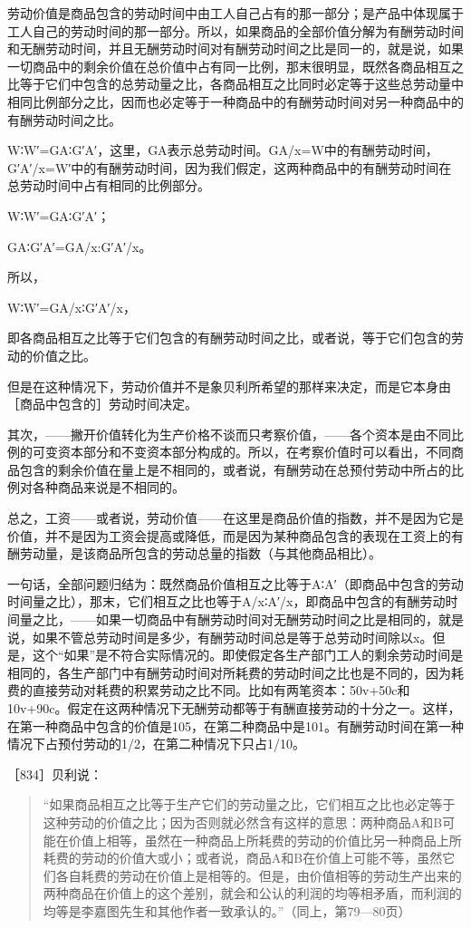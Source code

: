 劳动价值是商品包含的劳动时间中由工人自己占有的那一部分；是产品中体现属于工人自己的劳动时间的那一部分。所以，如果商品的全部价值分解为有酬劳动时间和无酬劳动时间，并且无酬劳动时间对有酬劳动时间之比是同一的，就是说，如果一切商品中的剩余价值在总价值中占有同一比例，那末很明显，既然各商品相互之比等于它们中包含的总劳动量之比，各商品相互之比同时必定等于这些总劳动量中相同比例部分之比，因而也必定等于一种商品中的有酬劳动时间对另一种商品中的有酬劳动时间之比。

W∶W′=GA∶G′A′，这里，GA表示总劳动时间。GA/x=W中的有酬劳动时间，G′A′/x=W′中的有酬劳动时间，因为我们假定，这两种商品中的有酬劳动时间在总劳动时间中占有相同的比例部分。

W∶W′=GA∶G′A′；

GA∶G′A′=GA/x:G′A′/x。

所以，

W∶W′=GA/x∶G′A′/x，

即各商品相互之比等于它们包含的有酬劳动时间之比，或者说，等于它们包含的劳动的价值之比。

但是在这种情况下，劳动价值并不是象贝利所希望的那样来决定，而是它本身由［商品中包含的］劳动时间决定。

其次，——撇开价值转化为生产价格不谈而只考察价值，——各个资本是由不同比例的可变资本部分和不变资本部分构成的。所以，在考察价值时可以看出，不同商品包含的剩余价值在量上是不相同的，或者说，有酬劳动在总预付劳动中所占的比例对各种商品来说是不相同的。

总之，工资——或者说，劳动价值——在这里是商品价值的指数，并不是因为它是价值，并不是因为工资会提高或降低，而是因为某种商品包含的表现在工资上的有酬劳动量，是该商品所包含的劳动总量的指数（与其他商品相比）。

一句话，全部问题归结为：既然商品价值相互之比等于A∶A′（即商品中包含的劳动时间量之比），那末，它们相互之比也等于A/x∶A′/x，即商品中包含的有酬劳动时间量之比，——如果一切商品中有酬劳动时间对无酬劳动时间之比是相同的，就是说，如果不管总劳动时间是多少，有酬劳动时间总是等于总劳动时间除以x。但是，这个“如果”是不符合实际情况的。即使假定各生产部门工人的剩余劳动时间是相同的，各生产部门中有酬劳动时间对所耗费的劳动时间之比也是不同的，因为耗费的直接劳动对耗费的积累劳动之比不同。比如有两笔资本：50v+50c和10v+90c。假定在这两种情况下无酬劳动都等于有酬直接劳动的十分之一。这样，在第一种商品中包含的价值是105，在第二种商品中是101。有酬劳动时间在第一种情况下占预付劳动的1/2，在第二种情况下只占1/10。

［834］贝利说：

\begin{quote}{“如果商品相互之比等于生产它们的劳动量之比，它们相互之比也必定等于这种劳动的价值之比；因为否则就必然含有这样的意思：两种商品A和B可能在价值上相等，虽然在一种商品上所耗费的劳动的价值比另一种商品上所耗费的劳动的价值大或小；或者说，商品A和B在价值上可能不等，虽然它们各自耗费的劳动在价值上是相等的。但是，由价值相等的劳动生产出来的两种商品在价值上的这个差别，就会和公认的利润的均等相矛盾，而利润的均等是李嘉图先生和其他作者一致承认的。”（同上，第79—80页）}\end{quote}

